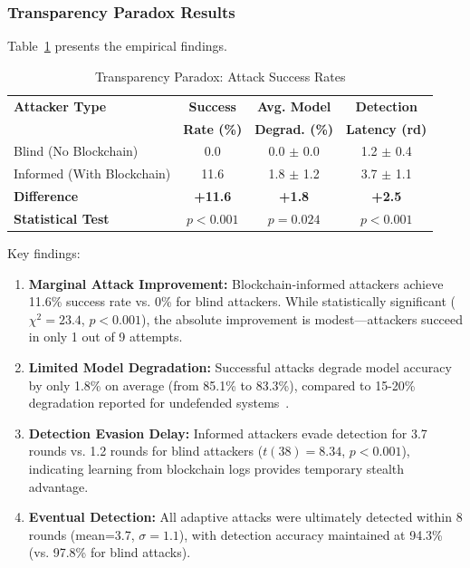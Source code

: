 \documentclass{ieeeaccess}
\begin{document}
\subsubsection{Transparency Paradox Results}

Table~\ref{tab:transparency_paradox} presents the empirical findings.

\begin{table}[t]
\caption{Transparency Paradox: Attack Success Rates}
\label{tab:transparency_paradox}
\centering
\begin{tabular}{lccc}
\toprule
\textbf{Attacker Type} & \textbf{Success} & \textbf{Avg. Model} & \textbf{Detection} \\
& \textbf{Rate (\%)} & \textbf{Degrad. (\%)} & \textbf{Latency (rd)} \\
\midrule
Blind (No Blockchain) & 0.0 & 0.0 $\pm$ 0.0 & 1.2 $\pm$ 0.4 \\
Informed (With Blockchain) & 11.6 & 1.8 $\pm$ 1.2 & 3.7 $\pm$ 1.1 \\
\midrule
\textbf{Difference} & \textbf{+11.6} & \textbf{+1.8} & \textbf{+2.5} \\
\textbf{Statistical Test} & $p<0.001$ & $p=0.024$ & $p<0.001$ \\
\bottomrule
\end{tabular}
\end{table}

Key findings:

\begin{enumerate}
    \item \textbf{Marginal Attack Improvement:} Blockchain-informed attackers achieve 11.6\% success rate vs. 0\% for blind attackers. While statistically significant ($\chi^2=23.4$, $p<0.001$), the absolute improvement is modest---attackers succeed in only 1 out of 9 attempts.
    
    \item \textbf{Limited Model Degradation:} Successful attacks degrade model accuracy by only 1.8\% on average (from 85.1\% to 83.3\%), compared to 15-20\% degradation reported for undefended systems~\cite{cao2024comprehensive}.
    
    \item \textbf{Detection Evasion Delay:} Informed attackers evade detection for 3.7 rounds vs. 1.2 rounds for blind attackers ($t(38)=8.34$, $p<0.001$), indicating learning from blockchain logs provides temporary stealth advantage.
    
    \item \textbf{Eventual Detection:} All adaptive attacks were ultimately detected within 8 rounds (mean=3.7, $\sigma=1.1$), with detection accuracy maintained at 94.3\% (vs. 97.8\% for blind attacks).
\end{enumerate}
\end{document}
